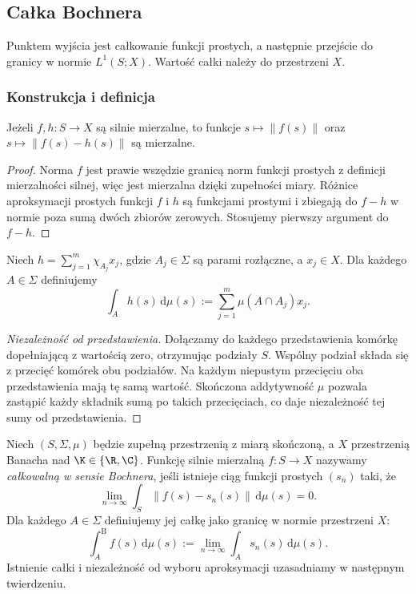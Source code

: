 \subsection{Całka Bochnera}

Punktem wyjścia jest całkowanie funkcji prostych, a następnie
przejście do granicy w normie $L^1(S;X)$. Wartość całki należy
do przestrzeni $X$.

\subsubsection{Konstrukcja i definicja}

\begin{lemat}
\label{lem:strong-norm-measurable15b}
Jeżeli $f,h:S\to X$ są silnie mierzalne, to funkcje
$s\mapsto\|f(s)\|$ oraz $s\mapsto\|f(s)-h(s)\|$ są mierzalne.
\end{lemat}
\begin{proof}
Norma $f$ jest prawie wszędzie granicą norm funkcji
prostych z definicji mierzalności silnej, więc jest
mierzalna dzięki zupełności miary. Różnice aproksymacji
prostych funkcji $f$ i $h$ są funkcjami prostymi i zbiegają
do $f-h$ w normie poza sumą dwóch zbiorów zerowych.
Stosujemy pierwszy argument do $f-h$.
\end{proof}

\begin{definicja}
\label{def:bochner-simple-integral15b}
Niech $h=\sum_{j=1}^m\chi_{A_j}x_j$, gdzie $A_j\in\Sigma$
są parami rozłączne, a $x_j\in X$. Dla każdego $A\in\Sigma$
definiujemy
\[
 \int_A h(s)\,\mathrm d\mu(s)
 :=\sum_{j=1}^m\mu(A\cap A_j)x_j.
\]
\end{definicja}
\begin{proof}[Niezależność od przedstawienia]
Dołączamy do każdego przedstawienia komórkę dopełniającą
z wartością zero, otrzymując podziały $S$. Wspólny podział
składa się z przecięć komórek obu podziałów.
Na każdym niepustym przecięciu oba przedstawienia mają
tę samą wartość. Skończona addytywność $\mu$ pozwala
zastąpić każdy składnik sumą po takich przecięciach,
co daje niezależność tej sumy od przedstawienia.
\end{proof}

\begin{definicja}
\label{def:bochner15b}
Niech $(S,\Sigma,\mu)$ będzie zupełną przestrzenią z miarą
skończoną, a $X$ przestrzenią Banacha nad $\K\in\{\R,\C\}$.
Funkcję silnie mierzalną $f:S\to X$ nazywamy
\emph{całkowalną w sensie Bochnera}, jeśli istnieje ciąg
funkcji prostych $(s_n)$ taki, że
\[
 \lim_{n\to\infty}\int_S\|f(s)-s_n(s)\|\,\mathrm d\mu(s)=0.
\]
Dla każdego $A\in\Sigma$ definiujemy jej całkę jako
granicę w normie przestrzeni $X$:
\[
 \int_A^{\mathrm B} f(s)\,\mathrm d\mu(s)
 :=\lim_{n\to\infty}\int_A s_n(s)\,\mathrm d\mu(s).
\]
Istnienie całki i niezależność od wyboru aproksymacji
uzasadniamy w następnym twierdzeniu.
\end{definicja}

